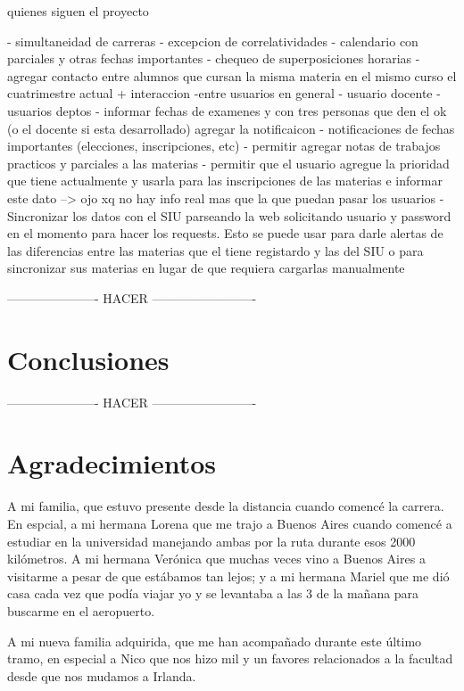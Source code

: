 \documentclass[a4paper]{article}
\begin{document}
quienes siguen el proyecto

- simultaneidad de carreras
- excepcion de correlatividades
- calendario con parciales y otras fechas importantes
- chequeo de superposiciones horarias
- agregar contacto entre alumnos que cursan la misma materia en el mismo curso el cuatrimestre actual + interaccion -entre usuarios en general
- usuario docente
- usuarios deptos
- informar fechas de examenes y con tres personas que den el ok (o el docente si esta desarrollado) agregar la notificaicon
- notificaciones de fechas importantes (elecciones, inscripciones, etc)
- permitir agregar notas de trabajos practicos y parciales a las materias
- permitir que el usuario agregue la prioridad que tiene actualmente y usarla para las inscripciones de las materias e informar este dato --> ojo xq no hay info real mas que la que puedan pasar los usuarios
- Sincronizar los datos con el SIU parseando la web solicitando usuario y password en el momento para hacer los requests. Esto se puede usar para darle alertas de las diferencias entre las materias que el tiene registardo y las del SIU o para sincronizar sus materias en lugar de que requiera cargarlas manualmente
 
---------------------- HACER -------------------------

\newpage
\section{Conclusiones}

---------------------- HACER -------------------------

\newpage
\section{Agradecimientos}

A mi familia, que estuvo presente desde la distancia cuando comencé la carrera. En espcial, a mi hermana Lorena que me trajo a Buenos Aires cuando comencé a estudiar en la universidad manejando ambas por la ruta durante esos 2000 kilómetros. A mi hermana Verónica que muchas veces vino a Buenos Aires a visitarme a pesar de que estábamos tan lejos; y a mi hermana Mariel que me dió casa cada vez que podía viajar yo y se levantaba a las 3 de la mañana para buscarme en el aeropuerto.

A mi nueva familia adquirida, que me han acompañado durante este último tramo, en especial a Nico que nos hizo mil y un favores relacionados a la facultad desde que nos mudamos a Irlanda.
\end{document}
